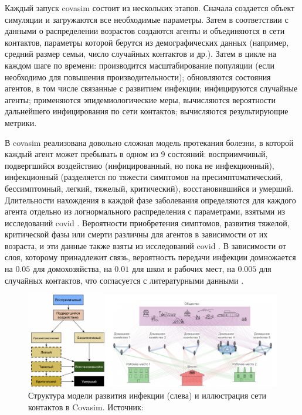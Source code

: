 \documentclass[a4paper,12pt]{article} %
\begin{document}
Каждый запуск \gls{covasim} состоит из нескольких этапов. Сначала создается объект симуляции и загружаются все необходимые параметры. Затем в соответствии с данными о распределении возрастов создаются агенты и объединяются в сети контактов, параметры которой берутся из демографических данных (например, средний размер семьи, число случайных контактов и др.). Затем в цикле на каждом шаге по времени: производится масштабирование популяции (если необходимо для повышения производительности); обновляются состояния агентов, в том числе связанные с развитием инфекции; инфицируются случайные агенты; применяются эпидемиологические меры, вычисляются вероятности дальнейшего инфицирования по сети контактов; вычисляются результирующие метрики.

В \gls{covasim} реализована довольно сложная модель протекания болезни, в которой каждый агент может пребывать в одном из 9 состояний: восприимчивый, подвергшийся воздействию (инфицированный, но пока не инфекционный), инфекционный (разделяется по тяжести симптомов на пресимптоматический, бессимптомный, легкий, тяжелый, критический), восстановившийся и умерший. Длительности нахождения в каждой фазе заболевания определяются для каждого агента отдельно из логнормального распределения с параметрами, взятыми из исследований \gls{covid} \cite{lauer2020incubation, du2020serial, nishiura2020serial, pung2020investigation, linton2020incubation, he2020temporal, wang2020clinical, chen2020clinical, verity2020estimates, wolfel2020virological}. Вероятности приобретения симптомов, развития тяжелой, критической фазы или смерти различны для агентов в зависимости от их возраста, и эти данные также взяты из исследований \gls{covid} \cite{chen2020clinical, wolfel2020virological, o2021age, baguelin2020report, ferguson2020impact}. В зависимости от слоя, которому принадлежит связь, вероятность передачи инфекции домножается на $0.05$ для домохозяйства, на $0.01$ для школ и рабочих мест, на $0.005$ для случайных контактов, что согласуется с литературными данными \cite{zhang2020changes, lader2006time}.

\begin{figure}[]
    \centering
    \includegraphics[width=\linewidth]{images/covasim.pdf}
    \caption{Структура модели развития инфекции (слева) и иллюстрация сети контактов в Covasim. Источник: \cite{kerr2021covasim}}
\end{figure}
\end{document}
